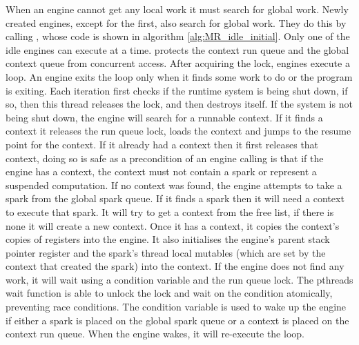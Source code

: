 When an engine cannot get any local work it must search for global work.
Newly created engines, except for the first, also search for global work.
They do this by calling \idle,
whose code is shown in algorithm \ref{alg:MR_idle_initial}.
Only one of the idle engines can execute \idle at a time.
 protects the context run queue and the
global context queue from concurrent access.
After acquiring the lock,
engines execute a loop.
An engine exits the loop only when it finds some work to do or the
program is exiting.
Each iteration first checks if the runtime system is being shut down,
if so,
then this thread releases the lock,
and then destroys itself.
If the system is not being shut down,
the engine will search for a runnable context.
If it finds a context it releases the run queue lock, loads the context
and jumps to the resume point for the context.
If it already had a context then it first releases that context,
doing so is safe as
a precondition of an engine calling \idle is that if the engine has
a context, the context must not contain a spark or represent a
suspended computation.
If no context was found, the engine attempts to take a spark from the global
spark queue.
If it finds a spark then it will need a context to execute that spark.
It will try to get a context from the free list, if there is none it will
create a new context.
Once it has a context,
it copies the context's copies of registers into the engine.
It also initialises the engine's parent stack pointer
register and the spark's thread local mutables
(which are set by the context that created the spark)
into the context.
If the engine does not find any work,
it will wait using a condition variable and the run queue lock.
The pthreads wait function is able to unlock the lock and wait on the
condition atomically, preventing race conditions.
The condition variable is used to wake up the engine if either a spark is
placed on the global spark queue or a context is placed on the context run
queue.
When the engine wakes,
it will re-execute the loop.

